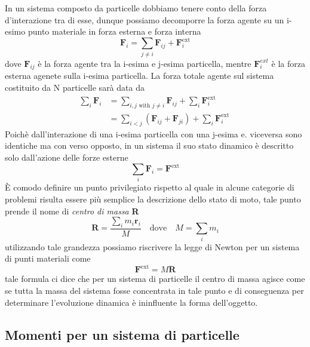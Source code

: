 In un sistema composto da particelle dobbiamo tenere conto della forza d'interazione tra di esse, dunque possiamo decomporre la forza agente su un i-esimo punto materiale in forza esterna e forza interna
\begin{equation}
\mathbf{F}_i=\sum_{j \neq i} \mathbf{F}_{i j}+\mathbf{F}_i^{\mathrm{ext}}
\end{equation}
dove $\bm{F}_{ij}$ \`{e} la forza agente tra la i-esima e j-esima particella, mentre $\bm{F}_{i}^{ext}$ \`{e} la forza esterna agenete sulla i-esima particella. La forza totale agente sul sistema costituito da N particelle sar\`{a} data da
\begin{equation}
\begin{aligned}
\sum_i \mathbf{F}_i & =\sum_{i, j \text { with } j \neq i} \mathbf{F}_{i j}+\sum_i \mathbf{F}_i^{\text {ext }} \\
& =\sum_{i<j}\left(\mathbf{F}_{i j}+\mathbf{F}_{j i}\right)+\sum_i \mathbf{F}_i^{\text {ext }}
\end{aligned}
\end{equation}
Poich\`{e} dall'interazione di una i-esima particella con una j-esima e. viceversa sono identiche ma con verso opposto, in un sistema il suo stato dinamico \`{e} descritto solo dall'azione delle forze esterne
\begin{equation}
\sum_i \mathbf{F}_i=\mathbf{F}^{\mathrm{ext}}
\end{equation}
\`{E} comodo definire un punto privilegiato rispetto al quale in alcune categorie di problemi risulta essere pi\`{u} semplice la descrizione dello stato di moto, tale punto prende il nome di \textit{centro di massa} \textbf{R}
\begin{equation}
\mathbf{R}=\frac{\sum_i m_i \mathbf{r}_i}{M} \quad \text{dove} \quad M = \sum_{i} m_i
\end{equation}
utilizzando tale grandezza possiamo riscrivere la legge di Newton per un sistema di punti materiali come 
\begin{equation}
\mathbf{F}^{\mathrm{ext}}=M \ddot{\mathbf{R}}
\end{equation}
tale formula ci dice che per un sistema di particelle il centro di massa agisce come se tutta la massa del sistema fosse concentrata in tale punto e di conseguenza per determinare l'evoluzione dinamica \`{e} ininfluente la forma dell'oggetto.

\subsection{Momenti per un sistema di particelle}

